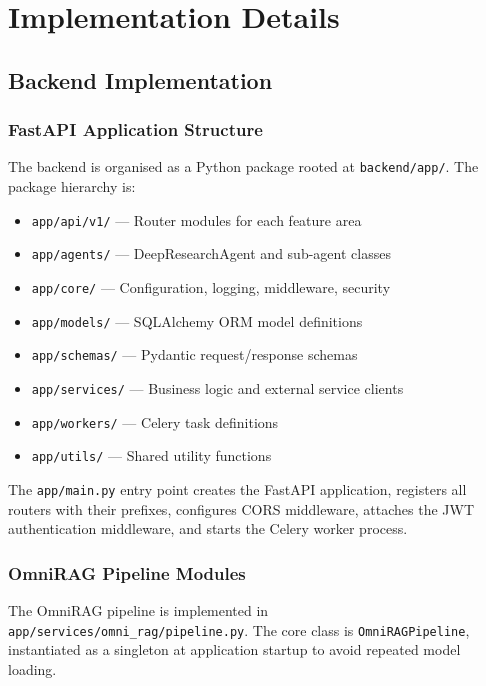 \chapter{Implementation Details}
\label{chap:implementation}

\section{Backend Implementation}
\label{sec:backend-impl}

\subsection{FastAPI Application Structure}
\label{subsec:fastapi-structure}

The backend is organised as a Python package rooted at \texttt{backend/app/}. The package hierarchy is:

\begin{itemize}
    \item \texttt{app/api/v1/} --- Router modules for each feature area
    \item \texttt{app/agents/} --- DeepResearchAgent and sub-agent classes
    \item \texttt{app/core/} --- Configuration, logging, middleware, security
    \item \texttt{app/models/} --- SQLAlchemy ORM model definitions
    \item \texttt{app/schemas/} --- Pydantic request/response schemas
    \item \texttt{app/services/} --- Business logic and external service clients
    \item \texttt{app/workers/} --- Celery task definitions
    \item \texttt{app/utils/} --- Shared utility functions
\end{itemize}

The \texttt{app/main.py} entry point creates the FastAPI application, registers all routers with their prefixes, configures CORS middleware, attaches the JWT authentication middleware, and starts the Celery worker process.

\subsection{OmniRAG Pipeline Modules}
\label{subsec:omnirag-impl}

The OmniRAG pipeline is implemented in \texttt{app/services/omni\_rag/pipeline.py}. The core class is \texttt{OmniRAGPipeline}, instantiated as a singleton at application startup to avoid repeated model loading.

